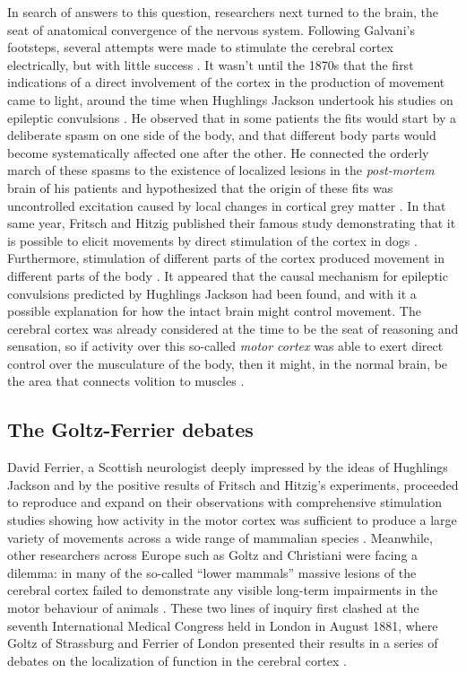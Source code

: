 In search of answers to this question, researchers next turned to the brain, the seat of anatomical convergence of the nervous system. Following Galvani's footsteps, several attempts were made to stimulate the cerebral cortex electrically, but with little success \citep{Gross2007}. It wasn't until the 1870s that the first indications of a direct involvement of the cortex in the production of movement came to light, around the time when Hughlings Jackson undertook his studies on epileptic convulsions \citep{Jackson1870}. He observed that in some patients the fits would start by a deliberate spasm on one side of the body, and that different body parts would become systematically affected one after the other. He connected the orderly march of these spasms to the existence of localized lesions in the \emph{post-mortem} brain of his patients and hypothesized that the origin of these fits was uncontrolled excitation caused by local changes in cortical grey matter \citep{Jackson1870}. In that same year, Fritsch and Hitzig published their famous study demonstrating that it is possible to elicit movements by direct stimulation of the cortex in dogs \citep{Fritsch1870}. Furthermore, stimulation of different parts of the cortex produced movement in different parts of the body \citep{Fritsch1870}. It appeared that the causal mechanism for epileptic convulsions predicted by Hughlings Jackson had been found, and with it a possible explanation for how the intact brain might control movement. The cerebral cortex was already considered at the time to be the seat of reasoning and sensation, so if activity over this so-called \emph{motor cortex} was able to exert direct control over the musculature of the body, then it might, in the normal brain, be the area that connects volition to muscles \citep{Fritsch1870}.

\subsection{The Goltz-Ferrier debates}

David Ferrier, a Scottish neurologist deeply impressed by the ideas of Hughlings Jackson and by the positive results of Fritsch and Hitzig's experiments, proceeded to reproduce and expand on their observations with comprehensive stimulation studies showing how activity in the motor cortex was sufficient to produce a large variety of movements across a wide range of mammalian species \citep{Ferrier1873}. Meanwhile, other researchers across Europe such as Goltz and Christiani were facing a dilemma: in many of the so-called ``lower mammals'' massive lesions of the cerebral cortex failed to demonstrate any visible long-term impairments in the motor behaviour of animals \citep{James1885,Goltz1888}.  These two lines of inquiry first clashed at the seventh International Medical Congress held in London in August 1881, where Goltz of Strassburg and Ferrier of London presented their results in a series of debates on the localization of function in the cerebral cortex \citep{Phillips1984,Tyler2000}.

